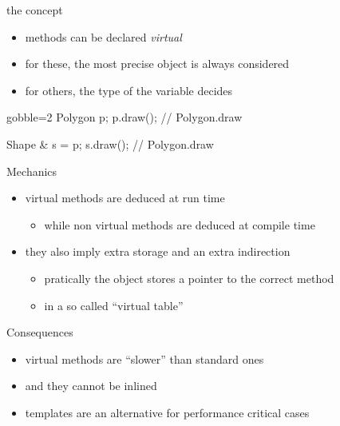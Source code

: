 \begin{frame}[fragile]
  \begin{block}{the concept}
    \begin{itemize}
    \item methods can be declared {\it virtual}
    \item for these, the most precise object is always considered
    \item for others, the type of the variable decides
    \end{itemize}
  \end{block}
  \begin{multicols}{2}
    \begin{cppcode*}{gobble=2}
      Polygon p;
      p.draw(); // Polygon.draw
      
      Shape & s = p;
      s.draw(); // Polygon.draw
    \end{cppcode*}
    \columnbreak
    \center
  \end{multicols}    
\end{frame}

\begin{frame}[fragile]
  \begin{block}{Mechanics}
    \begin{itemize}
    \item virtual methods are deduced at run time
      \begin{itemize}
      \item while non virtual methods are deduced at compile time
      \end{itemize}
    \item they also imply extra storage and an extra indirection
      \begin{itemize}
      \item pratically the object stores a pointer to the correct method
      \item in a so called ``virtual table''
      \end{itemize}
    \end{itemize}
  \end{block}
  \begin{alertblock}{Consequences}
    \begin{itemize}
    \item virtual methods are ``slower'' than standard ones
    \item and they cannot be inlined
    \item templates are an alternative for performance critical cases
    \end{itemize}
  \end{alertblock}
\end{frame}

